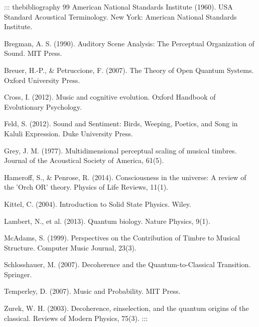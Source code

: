 \documentclass[a4paper,11pt]{article}
\begin{document}
::: thebibliography
99 American National Standards Institute (1960). USA Standard Acoustical
Terminology. New York: American National Standards Institute.

Bregman, A. S. (1990). Auditory Scene Analysis: The Perceptual
Organization of Sound. MIT Press.

Breuer, H.-P., & Petruccione, F. (2007). The Theory of Open Quantum
Systems. Oxford University Press.

Cross, I. (2012). Music and cognitive evolution. Oxford Handbook of
Evolutionary Psychology.

Feld, S. (2012). Sound and Sentiment: Birds, Weeping, Poetics, and Song
in Kaluli Expression. Duke University Press.

Grey, J. M. (1977). Multidimensional perceptual scaling of musical
timbres. Journal of the Acoustical Society of America, 61(5).

Hameroff, S., & Penrose, R. (2014). Consciousness in the universe: A
review of the 'Orch OR' theory. Physics of Life Reviews, 11(1).

Kittel, C. (2004). Introduction to Solid State Physics. Wiley.

Lambert, N., et al. (2013). Quantum biology. Nature Physics, 9(1).

McAdams, S. (1999). Perspectives on the Contribution of Timbre to
Musical Structure. Computer Music Journal, 23(3).

Schlosshauer, M. (2007). Decoherence and the Quantum-to-Classical
Transition. Springer.

Temperley, D. (2007). Music and Probability. MIT Press.

Zurek, W. H. (2003). Decoherence, einselection, and the quantum origins
of the classical. Reviews of Modern Physics, 75(3).
:::
\end{document}
